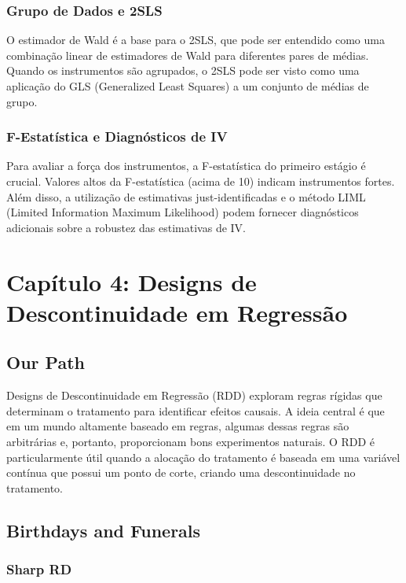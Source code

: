 \documentclass[a4paper,12pt]{article}[abntex2]
\begin{document}
\subsubsection*{Grupo de Dados e 2SLS}

O estimador de Wald é a base para o 2SLS, que pode ser entendido como uma combinação linear de estimadores de Wald para diferentes pares de médias. Quando os instrumentos são agrupados, o 2SLS pode ser visto como uma aplicação do GLS (Generalized Least Squares) a um conjunto de médias de grupo.

\subsubsection*{F-Estatística e Diagnósticos de IV}

Para avaliar a força dos instrumentos, a F-estatística do primeiro estágio é crucial. Valores altos da F-estatística (acima de 10) indicam instrumentos fortes. Além disso, a utilização de estimativas just-identificadas e o método LIML (Limited Information Maximum Likelihood) podem fornecer diagnósticos adicionais sobre a robustez das estimativas de IV.

\newpage

\section{Capítulo 4: Designs de Descontinuidade em Regressão}

\subsection*{Our Path}

Designs de Descontinuidade em Regressão (RDD) exploram regras rígidas que determinam o tratamento para identificar efeitos causais. A ideia central é que em um mundo altamente baseado em regras, algumas dessas regras são arbitrárias e, portanto, proporcionam bons experimentos naturais. O RDD é particularmente útil quando a alocação do tratamento é baseada em uma variável contínua que possui um ponto de corte, criando uma descontinuidade no tratamento.

\subsection{Birthdays and Funerals}

\subsubsection*{Sharp RD}
\end{document}
